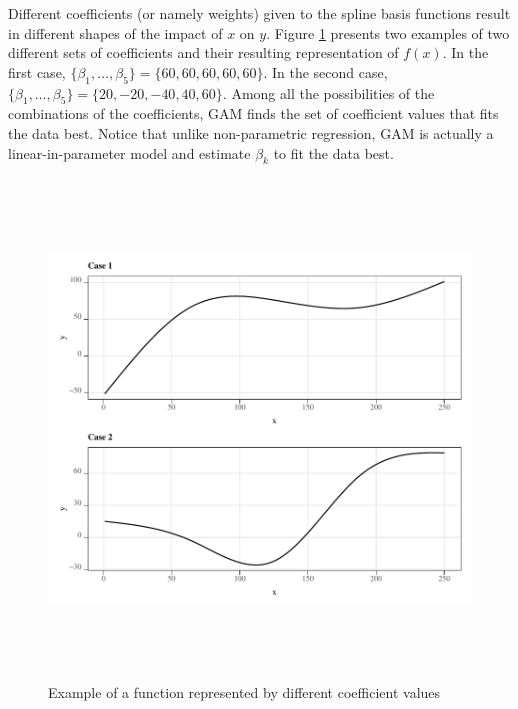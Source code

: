 \documentclass[
]{article}
\begin{document}
Different coefficients (or namely weights) given to the spline basis functions result in different shapes of the impact of \(x\) on \(y\). Figure \ref{fig:ex-fx} presents two examples of two different sets of coefficients and their resulting representation of \(f(x)\). In the first case, \(\{\beta_1, \dots, \beta_5\} = \{60, 60, 60, 60, 60\}\). In the second case, \(\{\beta_1, \dots, \beta_5\} = \{20, -20, -40, 40, 60\}\). Among all the possibilities of the combinations of the coefficients, GAM finds the set of coefficient values that fits the data best. Notice that unlike non-parametric regression, GAM is actually a linear-in-parameter model and estimate \(\beta_k\) to fit the data best.

\begin{figure}[H]

{\centering \includegraphics[width=6in,height=500px,]{../../Figures/g_il_y} 

}

\caption{Example of a function represented by different coefficient values}\label{fig:ex-fx}
\end{figure}

\clearpage

  
\end{document}
